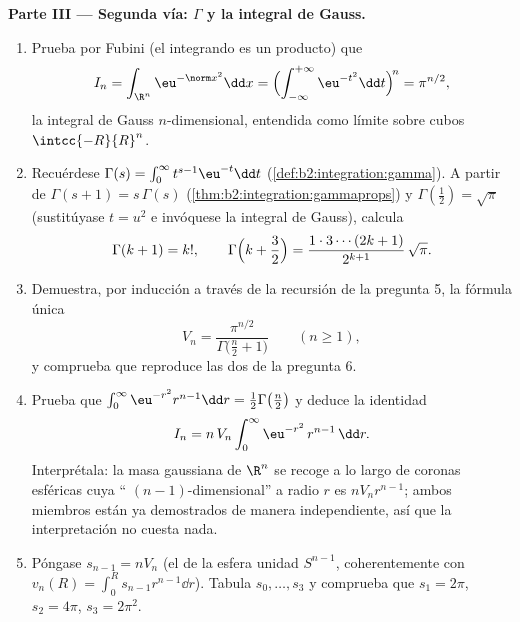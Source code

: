 \begin{problem}[{Problema de fin de semana --- $V_n =
\pi^{n/2}/\Gamma(\frac n2 + 1)$, y la rareza de las dimensiones
altas}]
\medskip
\noindent\textbf{Parte III --- Segunda vía: $\Gamma$ y la integral de
Gauss.}
\begin{enumerate}[resume]
  \item Prueba por Fubini (el integrando es un producto) que
        \[
        I_n = \int_{\R^n}\eu^{-\norm
        x^2}\dd x
        = \Bigl(\int_{-\infty}^{+\infty}
        \eu^{-t^2}\dd t\Bigr)^{\!n} = \pi^{n/2},
        \]
        la integral de Gauss $n$-dimensional, entendida como límite
        sobre cubos $\intcc{-R}{R}^n$.
  \item Recuérdese $\Gamma(s) = \int_0^\infty t^{s-1}\eu^{-t}\dd t$
        (\cref{def:b2:integration:gamma}). A partir de $\Gamma(s+1) =
        s\,\Gamma(s)$ (\cref{thm:b2:integration:gammaprops}) y
        $\Gamma(\tfrac12) = \sqrt\pi$ (sustitúyase $t = u^2$ e
        invóquese la integral de Gauss), calcula
        \[
        \Gamma(k + 1) = k!,
        \qquad
        \Gamma\Bigl(k + \frac32\Bigr) =
        \frac{1\cdot3\cdots(2k+1)}{2^{k+1}}\,\sqrt\pi .
        \]
  \item Demuestra, por inducción a través de la recursión de la
        pregunta 5, la fórmula única
        \[
        V_n = \frac{\pi^{n/2}}{\Gamma\bigl(\frac n2 +
        1\bigr)} \qquad (n \geq 1),
        \]
        y comprueba que reproduce las dos  de la
        pregunta 6.
  \item Prueba que $\int_0^\infty \eu^{-r^2}r^{n-1}\dd r =
        \tfrac12\Gamma\bigl(\tfrac n2\bigr)$ y deduce la identidad
        \[
        I_n = n\,V_n\int_0^\infty \eu^{-r^2}\,r^{n-1}\,\dd r.
        \]
        Interprétala: la masa gaussiana de $\R^n$ se recoge a lo
        largo de coronas esféricas cuya ``
        $(n-1)$-dimensional'' a radio $r$ es $nV_nr^{n-1}$; ambos
        miembros están ya demostrados de manera independiente, así
        que la interpretación no cuesta nada.
  \item Póngase $s_{n-1} = nV_n$ (el  de la esfera unidad
        $S^{n-1}$, coherentemente con $v_n(R) = \int_0^R
        s_{n-1}r^{n-1}\dd r$). Tabula $s_0, \dots, s_3$ y comprueba
        que $s_1 = 2\pi$, $s_2 = 4\pi$, $s_3 = 2\pi^2$.
\end{enumerate}


\end{problem}
